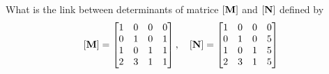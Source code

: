 \bexo
What is the link between determinants of matrice $\left[ \textbf{M} \right]$ and $\left[ \textbf{N} \right]$ defined by 
\begin{equation}
\left[ \textbf{M} \right]=
\begin{bmatrix}
	1& 0& 0& 0\\
0& 1& 0& 1\\
1& 0& 1& 1\\
2& 3& 1& 1
\end{bmatrix} , \quad
\left[ \textbf{N} \right]=
\begin{bmatrix}
	1& 0& 0& 0\\
0& 1& 0& 5\\
1& 0& 1& 5\\
2& 3& 1& 5
\end{bmatrix}
\end{equation}
\eexo


